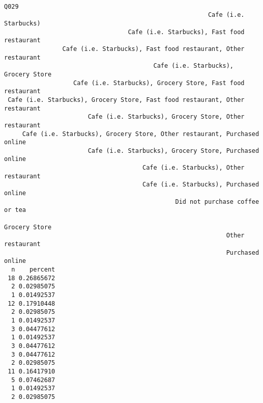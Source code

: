 \documentclass[]{article}
\newenvironment{Shaded}{\begin{snugshade}}{\end{snugshade}}
\newcommand{\KeywordTok}[1]{\textcolor[rgb]{0.13,0.29,0.53}{\textbf{#1}}}
\newcommand{\NormalTok}[1]{#1}
\newcommand{\OperatorTok}[1]{\textcolor[rgb]{0.81,0.36,0.00}{\textbf{#1}}}
\newcommand{\StringTok}[1]{\textcolor[rgb]{0.31,0.60,0.02}{#1}}
\begin{document}
\begin{verbatim}
                                                                         Q029
                                                        Cafe (i.e. Starbucks)
                                  Cafe (i.e. Starbucks), Fast food restaurant
                Cafe (i.e. Starbucks), Fast food restaurant, Other restaurant
                                         Cafe (i.e. Starbucks), Grocery Store
                   Cafe (i.e. Starbucks), Grocery Store, Fast food restaurant
 Cafe (i.e. Starbucks), Grocery Store, Fast food restaurant, Other restaurant
                       Cafe (i.e. Starbucks), Grocery Store, Other restaurant
     Cafe (i.e. Starbucks), Grocery Store, Other restaurant, Purchased online
                       Cafe (i.e. Starbucks), Grocery Store, Purchased online
                                      Cafe (i.e. Starbucks), Other restaurant
                                      Cafe (i.e. Starbucks), Purchased online
                                               Did not purchase coffee or tea
                                                                Grocery Store
                                                             Other restaurant
                                                             Purchased online
  n    percent
 18 0.26865672
  2 0.02985075
  1 0.01492537
 12 0.17910448
  2 0.02985075
  1 0.01492537
  3 0.04477612
  1 0.01492537
  3 0.04477612
  3 0.04477612
  2 0.02985075
 11 0.16417910
  5 0.07462687
  1 0.01492537
  2 0.02985075
\end{verbatim}

\begin{Shaded}
\end{Shaded}
\end{document}
